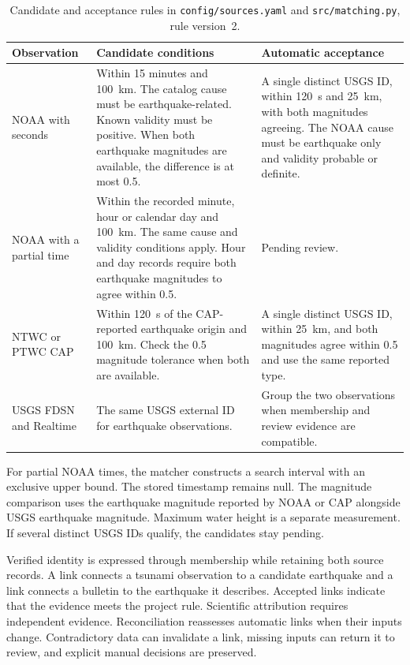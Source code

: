 \documentclass[a4paper,11pt,oneside]{book}
\begin{document}
\begin{table}[!htbp]
\centering
\small
\begin{tabularx}{\textwidth}{@{}L{2.9cm}YY@{}}
\toprule
Observation & Candidate conditions & Automatic acceptance \\
\midrule
NOAA with seconds & Within 15 minutes and 100~km. The catalog cause must be earthquake-related. Known validity must be positive. When both earthquake magnitudes are available, the difference is at most 0.5. & A single distinct USGS ID, within 120~s and 25~km, with both magnitudes agreeing. The NOAA cause must be earthquake only and validity probable or definite. \\
NOAA with a partial time & Within the recorded minute, hour or calendar day and 100~km. The same cause and validity conditions apply. Hour and day records require both earthquake magnitudes to agree within 0.5. & Pending review. \\
NTWC or PTWC CAP & Within 120~s of the CAP-reported earthquake origin and 100~km. Check the 0.5 magnitude tolerance when both are available. & A single distinct USGS ID, within 25~km, and both magnitudes agree within 0.5 and use the same reported type. \\
USGS FDSN and Realtime & The same USGS external ID for earthquake observations. & Group the two observations when membership and review evidence are compatible. \\
\bottomrule
\end{tabularx}
\caption[Candidate and acceptance rules]{Candidate and acceptance rules in \texttt{config/sources.yaml} and \texttt{src/matching.py}, rule version~2.}
\label{tab:matching-policy}
\end{table}

For partial NOAA times, the matcher constructs a search interval with an exclusive upper bound. The stored timestamp remains null. The magnitude comparison uses the earthquake magnitude reported by NOAA or CAP alongside USGS earthquake magnitude. Maximum water height is a separate measurement. If several distinct USGS IDs qualify, the candidates stay pending.

Verified identity is expressed through  membership while retaining both source records. A  link connects a tsunami observation to a candidate earthquake and a  link connects a bulletin to the earthquake it describes. Accepted links indicate that the evidence meets the project rule. Scientific attribution requires independent evidence. Reconciliation reassesses automatic links when their inputs change. Contradictory data can invalidate a link, missing inputs can return it to review, and explicit manual decisions are preserved.
\end{document}
